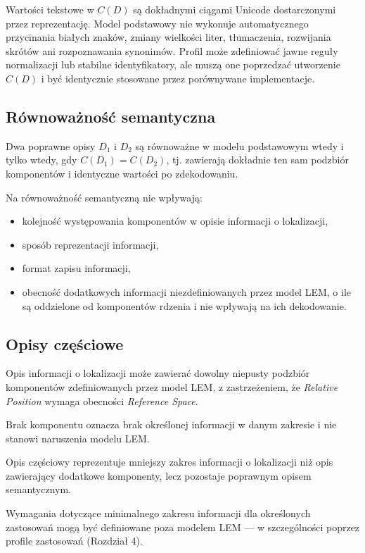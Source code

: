 Wartości tekstowe w $C(D)$ są dokładnymi ciągami Unicode dostarczonymi przez reprezentację. Model podstawowy nie wykonuje automatycznego przycinania białych znaków, zmiany wielkości liter, tłumaczenia, rozwijania skrótów ani rozpoznawania synonimów. Profil może zdefiniować jawne reguły normalizacji lub stabilne identyfikatory, ale muszą one poprzedzać utworzenie $C(D)$ i być identycznie stosowane przez porównywane implementacje.

\subsection{Równoważność semantyczna}
\label{sec:rownowaznosc-semantyczna}
Dwa poprawne opisy $D_1$ i $D_2$ są równoważne w modelu podstawowym wtedy i tylko wtedy, gdy $C(D_1)=C(D_2)$, tj. zawierają dokładnie ten sam podzbiór komponentów i identyczne wartości po zdekodowaniu.

Na równoważność semantyczną nie wpływają:
\begin{itemize}[noitemsep,topsep=2pt]
    \item kolejność występowania komponentów w opisie informacji o lokalizacji,
    \item sposób reprezentacji informacji,
    \item format zapisu informacji,
    \item obecność dodatkowych informacji niezdefiniowanych przez model LEM, o ile są oddzielone od komponentów rdzenia i nie wpływają na ich dekodowanie.
\end{itemize}

\subsection{Opisy częściowe}
\label{sec:opisy-czesciowe}
Opis informacji o lokalizacji może zawierać dowolny niepusty podzbiór komponentów zdefiniowanych przez model LEM, z zastrzeżeniem, że \textit{Relative Position} wymaga obecności \textit{Reference Space}.

Brak komponentu oznacza brak określonej informacji w danym zakresie i nie stanowi naruszenia modelu LEM.

Opis częściowy reprezentuje mniejszy zakres informacji o lokalizacji niż opis zawierający dodatkowe komponenty, lecz pozostaje poprawnym opisem semantycznym.

Wymagania dotyczące minimalnego zakresu informacji dla określonych zastosowań mogą być definiowane poza modelem LEM --- w szczególności poprzez profile zastosowań (Rozdział 4).

